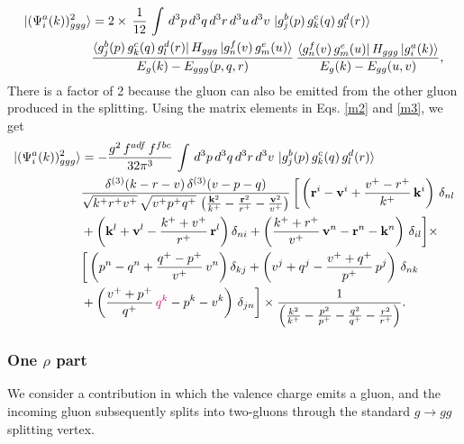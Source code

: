 \documentclass[a4paper,11pt]{article}
\def\v#1{\mathbf{#1}}
\begin{document}
\begin{figure}[htbp]
    \centering
\end{figure}
\begin{align}
    \ket{(\Psi^{a}_{i}(k))^{2}_{ggg}} &  = 2\times\,\frac{1}{12}\, \int\, d^{3}p\,d^{3}q\, d^{3}r\, d^{3}u\, d^{3}v\,\ket{g^{b}_{j}(p)\,g^{c}_{k}(q)\,g^{d}_{l}(r)}\,\notag \\ & \frac{\bra{g^{b}_{j}(p)\,g^{c}_{k}(q)\,g^{d}_{l}(r)}H_{ggg}\ket{g^{f}_{n}(v)\,g^{e}_{m}(u)}}{E_{g}(k)-E_{ggg}(p,q,r)}\,\frac{\bra{g^{f}_{n}(v)\,g^{e}_{m}(u)}H_{ggg}\ket{g^{a}_{i}(k)}}{E_{g}(k)-E_{gg}(u,v)},
\end{align}
There is a factor of 2 because the gluon can also be emitted from the other gluon produced in the splitting. Using the matrix elements in Eqs. \eqref{m2} and \eqref{m3}, we get
\begin{align}
    \ket{(\Psi^{a}_{i}(k))^{2}_{ggg}} & = -\frac{g^{2}\, f^{adf}\,f^{fbc}}{32\pi^{3}}\, \int\, d^{3}p\, d^{3}q\, d^{3}r\, d^{3}v\, \ket{g^{b}_{j}(p)\,g^{c}_{k}(q)\,g^{d}_{l}(r)}\notag \\  & \frac{\delta^{(3)}(k-r-v)\, \delta^{(3)}(v-p-q)}{\sqrt{k^{+}r^{+}v^{+}}\,\sqrt{v^{+}p^{+}q^{+}}\,\left(\frac{\v{k}^{2}}{k^{+}}-\frac{\v{r}^{2}}{r^{+}}-\frac{\v{v}^{2}}{v^{+}}\right)}\,\bigg[\left(\v{r}^{i}-\v{v}^{i}+\frac{v^{+}-r^{+}}{k^{+}}\,\v{k}^{i}\right)\, \delta_{nl} \notag \\ & + \left(\v{k}^{l}+\v{v}^{l}-\frac{k^{+}+v^{+}}{r^{+}}\,\v{r}^{l}\right)\delta_{ni} + \left(\frac{k^{+}+r^{+}}{v^{+}}\,\v{v}^{n} -\v{r}^{n}-\v{k}^{n}\right)\,\delta_{il}\bigg] \times \notag \\ &  \bigg[\left(p^{n}-q^{n}+\frac{q^{+}-p^{+}}{v^{+}}\,v^{n}\right)\delta_{kj} + \left(v^{j}+q^{j}-\frac{v^{+}+q^{+}}{p^{+}}\,p^{j}\right)\,\delta_{nk}\notag \\ & +\left(\frac{v^{+}+p^{+}}{q^{+}}\,{\color{chg}q^{k}}-p^{k}-v^{k}\right)\,\delta_{jn}\bigg]\times \frac{1}{\left(\frac{k^{2}}{k^{+}}-\frac{p^{2}}{p^{+}}-\frac{q^{2}}{q^{+}}-\frac{r^{2}}{r^{+}}\right)}.
\end{align}
\subsubsection*{One $\rho$ part}
We consider a contribution in which the valence charge emits a gluon, and the incoming gluon subsequently splits into two-gluons through the standard $g\rightarrow gg$ splitting vertex.
\end{document}
